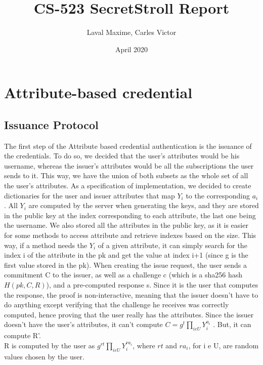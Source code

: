 \documentclass[10pt,conference,compsocconf]{IEEEtran}
\title{CS-523 SecretStroll Report}
\author{Laval Maxime, Carles Victor}
\date{April 2020}
\begin{document}
\maketitle

\section{Attribute-based credential}

\subsection{Issuance Protocol}

The first step of the Attribute based credential authentication is the issuance of the credentials. To do so, we decided that the user's attributes would be his username, whereas the issuer's attributes would be all the subscriptions the user sends to it. This way, we have the union of both subsets as the whole set of all the user's attributes. As a specification of implementation, we decided to create dictionaries for the user and issuer attributes that map $Y_{i}$ to the corresponding $a_{i}$. All $Y_{i}$ are computed by the server when generating the keys, and they are stored in the public key at the index corresponding to each attribute, the last one being the username. We also stored all the attributes in the public key, as it is easier for some methods to access attribute and retrieve indexes based on the size. 
This way, if a method needs the $Y_{i}$ of a given attribute, it can simply search for the index i of the attribute in the pk and get the value at index i+1 (since g is the first value stored in the pk).
When creating the issue request, the user sends a commitment C to the issuer, as well as a challenge c (which is a sha256 hash $H(pk,C,R)$), and a pre-computed response s. Since it is the user that computes the response, the proof is non-interactive, meaning that the issuer doesn't have to do anything except verifying that the challenge he receives was correctly computed, hence proving that the user really has the attributes. Since the issuer doesn't have the user's attributes, it can't compute $C = g^t \prod_{i e U}{Y_{i}^{a_{i}}}$ . 
But, it can compute R'. 
\\	
\hspace{1cm}
R is computed by the user as $g^{rt} \prod_{i e U}{Y_{i}^{ra_{i}}}$, where $rt$ and $ra_{i}$, for i e U, are random values chosen by the user. 
\\	
\hspace{1cm}
\end{document}
